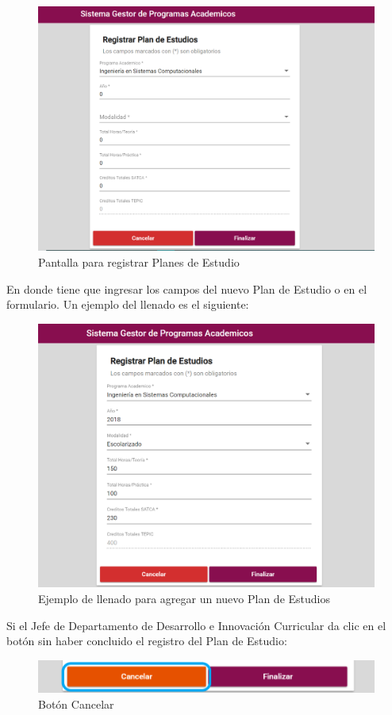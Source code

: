 \begin{figure}[H]
	\centering
	\hypertarget{registrarPE}{\includegraphics[width=0.7\linewidth]{images/SP4-GPE/registrarPE}}
	\caption{Pantalla para registrar Planes de Estudio}
	\label{registrarPE}
\end{figure}
\newpage
En donde tiene que ingresar los campos del nuevo Plan de Estudio o en el formulario. Un ejemplo del llenado es el siguiente:

\begin{figure}[H]
	\centering
	\hypertarget{ejreg}{\includegraphics[width=0.7\linewidth]{images/SP4-GPE/registrarEjem}}
	\caption{Ejemplo de llenado para agregar un nuevo Plan de Estudios}
	\label{ejreg}
\end{figure}
Si el Jefe de Departamento de Desarrollo e Innovación Curricular da clic en el botón  sin haber concluido el registro del Plan de Estudio:

\begin{figure}[H]
	\centering
	\hypertarget{cancel2}{\includegraphics[width=0.7\linewidth]{images/SP4-GPE/cancelarPE}}
	\caption{Botón Cancelar}
	\label{cancel2}
\end{figure}
\newpage

